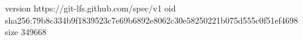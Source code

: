version https://git-lfs.github.com/spec/v1
oid sha256:79b8c334b9f1839523c7e69b6892e8062c30e58250221b075d555c0f51ef4698
size 349668

